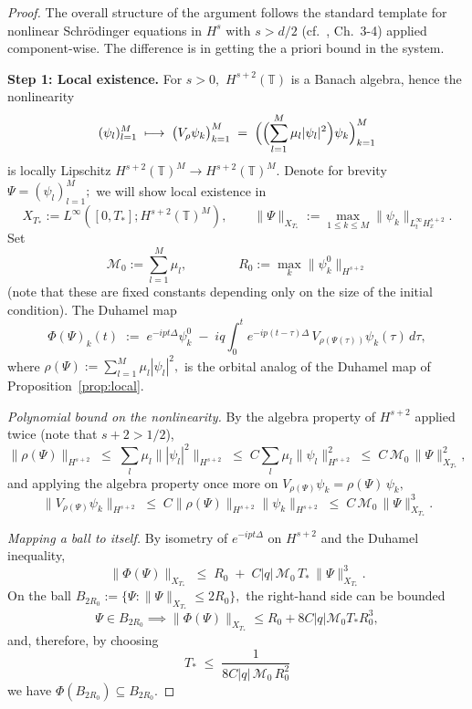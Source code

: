 \documentclass[11pt]{amsart}
\theoremstyle{definition}
\newcommand{\T}{\mathbb{T}}
\begin{document}
\begin{proof}
The overall structure of the argument follows the standard  template for nonlinear Schr\"odinger equations in $H^s$ with $s>d/2$ (cf.\ \cite{Cazenave2003}, Ch.\ 3-4) applied component-wise. The difference is in getting the a priori bound in the system.

\smallskip

\noindent\textbf{Step 1: Local existence.} For $s>0,$ $H^{s+2}(\T)$ is a Banach algebra, hence the nonlinearity
\[
  (\psi_l)_{l=1}^M\;\longmapsto\;\bigl(V_{\rho}\psi_k\bigr)_{k=1}^M
  \;=\;\Bigl(\Bigl(\sum_{l=1}^M\mu_l|\psi_l|^2\Bigr)\psi_k\Bigr)_{k=1}^M
\]
is  locally Lipschitz $H^{s+2}(\T)^M\to H^{s+2}(\T)^M.$ Denote for brevity $\Psi=(\psi_l)_{l=1}^M;$ we will show local existence in
\[
  X_{T_*}:=L^\infty([0,T_*];H^{s+2}(\T)^M),
  \qquad
  \|\Psi\|_{X_{T_*}}:=\max_{1\le k\le M}\|\psi_k\|_{L^\infty_t H^{s+2}_x}.
\]
Set 
\[
\mathcal{M}_0:=\sum_{l=1}^M\mu_l, \qquad \qquad R_0:=\max_k\|\psi_k^0\|_{H^{s+2}}
\]
(note that these are fixed  constants depending only on the size of the initial condition).
 The Duhamel map
\begin{equation}\label{eq:Phi_finiteNLS}
  \Phi(\Psi)_k(t)\;:=\;e^{-ipt\Delta}\psi_k^0\;-\;iq\int_0^t e^{-ip(t-\tau)\Delta}\,V_{\rho(\Psi(\tau))}\psi_k(\tau)\,d\tau,
\end{equation}
where $\rho(\Psi):=\sum_{l=1}^M\mu_l|\psi_l|^2,$
is the orbital analog of the Duhamel map of Proposition~\ref{prop:local}.

\smallskip

\noindent\emph{Polynomial bound on the nonlinearity.} By the algebra property of $H^{s+2}$ applied twice (note that $s+2>1/2$),
\[
  \|\rho(\Psi)\|_{H^{s+2}}\;\le\;\sum_l\mu_l\||\psi_l|^2\|_{H^{s+2}}\;\le\;C\sum_l\mu_l\|\psi_l\|_{H^{s+2}}^2\;\le\;C\,\mathcal{M}_0\,\|\Psi\|_{X_{T_*}}^2,
\]
and applying the algebra property once more on $V_{\rho(\Psi)}\psi_k=\rho(\Psi)\,\psi_k,$
\begin{equation}\label{eq:cubic_bound_finiteNLS}
  \|V_{\rho(\Psi)}\psi_k\|_{H^{s+2}}\;\le\;C\|\rho(\Psi)\|_{H^{s+2}}\|\psi_k\|_{H^{s+2}}\;\le\;C\,\mathcal{M}_0\,\|\Psi\|_{X_{T_*}}^3.
\end{equation}

\smallskip

\noindent\emph{Mapping a ball to itself.} By isometry of $e^{-ipt\Delta}$ on $H^{s+2}$ and the Duhamel inequality,
\[
  \|\Phi(\Psi)\|_{X_{T_*}}\;\le\;R_0\;+\;C|q|\,\mathcal{M}_0\,T_*\,\|\Psi\|_{X_{T_*}}^3.
\]
On the ball $B_{2R_0}:=\{\Psi:\|\Psi\|_{X_{T_*}}\le 2R_0\},$ the right-hand side can be bounded
\[
\Psi \in B_{2R_0} \implies \| \Phi(\Psi)\|_{X_{T_*}} \le R_0+8C|q|\mathcal{M}_0 T_*R_0^3,
\]
and, therefore, by choosing
\begin{equation}\label{eq:Tstar_bound_finiteNLS}
  T_*\;\le\;\frac{1}{8C|q|\,\mathcal{M}_0\,R_0^2}
\end{equation}
we have $\Phi(B_{2R_0}) \subseteq B_{2R_0}.$
\smallskip


\end{proof}
\end{document}

